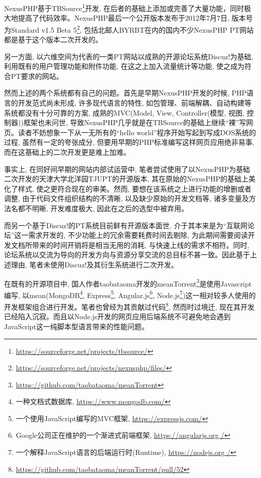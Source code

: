 NexusPHP基于TBSource\footnote{\url{https://sourceforge.net/projects/tbsource/}}开发, 在后者的基础上添加或完善了大量功能，同时极大地提高了代码效率\cite{nexusteam2011about}。NexusPHP最后一个公开版本发布于2012年7月7日, 版本号为Standard v1.5 Beta 5\footnote{\url{https://sourceforge.net/projects/nexusphp/files/}}, 包括北邮人BYRBT在内的国内不少NexusPHP PT网站都是基于这个版本二次开发的。

另一方面, 以六维空间为代表的一类PT网站以成熟的开源论坛系统Discuz!为基础, 利用既有的用户管理功能和附件功能, 在这之上加入流量统计等功能, 使之成为符合PT要求的网站。

然而上述的两个系统都有自己的问题。首先是早期NexusPHP开发的时候, PHP语言的开发范式尚未形成, 许多现代语言的特性, 如包管理、前端解耦、自动构建等系统都没有十分可靠的方案, 成熟的MVC(Model, View, Controller(模型,  视图, 控制器))框架也未问世, 导致NexusPHP几乎就是在TBSource的基础上继续``裸''写网页。读者不妨想象一下从一无所有的``hello world''程序开始写起到写成DOS系统的过程, 虽然有一定的夸张成分, 但要用早期的PHP标准编写这样网页应用绝非易事, 而在这基础上的二次开发更是难上加难。

事实上, 在同好间早期的网站内部试运营中, 笔者尝试使用了以NexusPHP为基础二次开发的天津大学北洋园TJUPT的开源版本, 其在原始的NexusPHP的基础上美化了样式, 使之更符合现在的审美。然而, 要想在该系统之上进行功能的增删或者调整, 由于代码文件组织结构的不清晰, 以及缺少原始的开发文档等, 诸多变量及方法名都不明晰, 开发难度极大, 因此在之后的选型中被弃用。

而另一个基于Discuz!的PT系统目前鲜有开源版本面世, 介于其本来是为``互联网论坛''这一需求开发的, 不少功能上的冗余需要耗费时间去剔除, 为此期间需要阅读开发文档所带来的时间开销将是相当无用的消耗, 与快速上线的需求不相符。同时, 论坛系统以交流为导向的开发方向与资源分享交流的总目标不甚一致。因此基于上述理由, 笔者未使用Discuz!及其衍生系统进行二次开发。

在既有的开源项目中, 国人作者taobataoma开发的meanTorrent\footnote{\url{https://github.com/taobataoma/meanTorrent}}是使用Javascript编写, 以mean(MongoDB\footnote{一种文档式数据库, \url{https://www.mongodb.com/}}, Express\footnote{一个使用JavaScript编写的MVC框架, \url{https://expressjs.com/}}, Angular.js\footnote{Google公司正在维护的一个渐进式前端框架, \url{https://angularjs.org
/}}, Node.js\footnote{一个解释JavaScript语言的后端运行时(Runtime), \url{https://nodejs.org
/}})这一相对较多人使用的开发框架组合进行开发。笔者也曾经为其贡献过代码\footnote{\url{https://github.com/taobataoma/meanTorrent/pull/52}}, 然而时过境迁, 现在其开发已经陷入沉寂。而且以Node.js开发的网页应用后端系统不可避免地会遇到JavaScript这一纯脚本型语言带来的性能问题。

